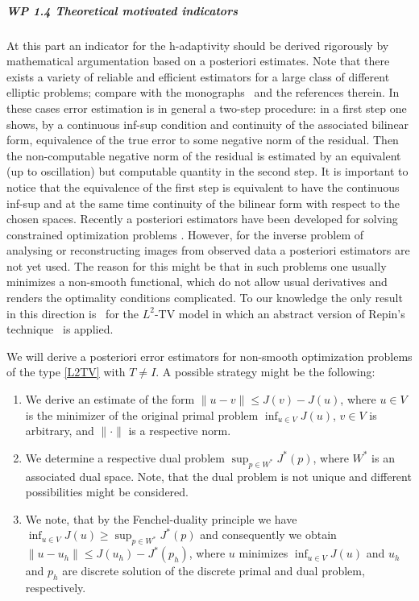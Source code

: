 \documentclass[enabledeprecatedfontcommands,cleardoublepage=empty,headsepline,twoside,11pt,DIV=15,BCOR=12mm,final]{scrartcl}
\begin{document}
 

 
%
% 
 
 
 \subparagraph{WP 1.4 Theoretical motivated indicators}
 
  At this part an indicator for the h-adaptivity should be derived rigorously by mathematical argumentation based on a posteriori estimates. Note that there exists a variety of reliable and efficient estimators for a large class of different elliptic problems; compare with the monographs~\cite{AinOde,Ciarlet:02,Verfurth:96} and the references therein. In these cases error estimation is in general a two-step procedure: in a first step one shows, by a continuous inf-sup condition and continuity of the associated bilinear form, equivalence of the true error to some negative norm of the residual. Then the non-computable negative norm of the residual is estimated by an equivalent (up to oscillation) but computable quantity in the second step. It is important to notice that the equivalence of the first step is equivalent to have the continuous inf-sup and at the same time continuity of the bilinear form with respect to the chosen spaces. Recently a posteriori estimators have been developed for solving constrained optimization problems \cite{KoRoSi:14}. However, for the inverse problem of analysing or reconstructing images from observed data a posteriori estimators are not yet used. The reason for this might be that in such problems one usually minimizes a non-smooth functional, which do not allow usual derivatives and renders the optimality conditions complicated. To our knowledge the only result in this direction is~\cite{Bar2015} for the $L^2$-TV model in which an abstract version of Repin's technique~\cite{Repin} is applied.
 
 We will derive a posteriori error estimators for non-smooth optimization problems of the type \eqref{L2TV} with $T\not= I$. A possible strategy might be the following: 
\begin{enumerate}[1.]
\item We derive an estimate of the form $\|u -v \| \leq J(v) - J(u)$, where $u\in V$ is the minimizer of the original primal problem $\inf_{u\in V} J(u)$, $v\in V$ is arbitrary, and $\|\cdot\|$ is a respective norm.
\item We determine a respective dual problem $\sup_{p\in W^*} J^*(p)$, where $W^*$ is an associated dual space. Note, that the dual problem is not unique and different possibilities might be considered. %
\item We note, that by the Fenchel-duality principle we have $\inf_{u\in V} J(u)\geq \sup_{p\in W^*} J^*(p)$ and consequently we obtain $\|u -u_h \| \leq J(u_h) - J^*(p_h)$, where $u$ minimizes  $\inf_{u\in V} J(u)$ and $u_h$ and $p_h$ are discrete solution of the discrete primal and dual problem, respectively. 
\end{enumerate} 
\end{document}
